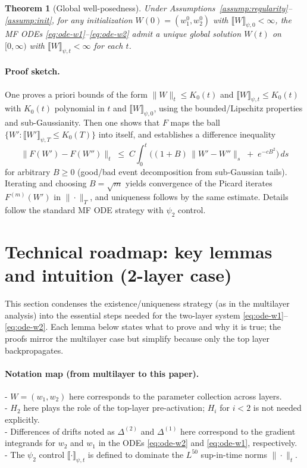 \documentclass[11pt]{article}
\newcommand{\1}{\mathbbm{1}}
\newtheorem{theorem}{Theorem}
\begin{document}
\begin{theorem}[Global well-posedness]\label{thm:wellposed}
Under Assumptions~\ref{assump:regularity}--\ref{assump:init}, for any initialization $W(0)=(w_1^0,w_2^0)$ with $\llbracket W\rrbracket_{\psi,0}<\infty$, the MF ODEs \eqref{eq:ode-w1}--\eqref{eq:ode-w2} admit a unique global solution $W(t)$ on $[0,\infty)$ with $\llbracket W\rrbracket_{\psi,t}<\infty$ for each $t$.
\end{theorem}

\paragraph{Proof sketch.}
One proves a priori bounds of the form $\|W\|_t\le K_0(t)$ and $\llbracket W\rrbracket_{\psi,t}\le K_0(t)$ with $K_0(t)$ polynomial in $t$ and $\llbracket W\rrbracket_{\psi,0}$, using the bounded/Lipschitz properties and sub-Gaussianity. Then one shows that $F$ maps the ball $\{W':\llbracket W'\rrbracket_{\psi,T}\le K_0(T)\}$ into itself, and establishes a difference inequality
\[
\|F(W')-F(W'')\|_t \;\le\; C\!\int_0^t \Big( (1+B)\,\|W'-W''\|_s \;+\; e^{-cB^2}\Big)\,ds
\]
for arbitrary $B\ge 0$ (good/bad event decomposition from sub-Gaussian tails). Iterating and choosing $B=\sqrt{m}$ yields convergence of the Picard iterates $F^{(m)}(W')$ in $\|\cdot\|_T$, and uniqueness follows by the same estimate. Details follow the standard MF ODE strategy with $\psi_2$ control.

\section{Technical roadmap: key lemmas and intuition (2-layer case)}

This section condenses the existence/uniqueness strategy (as in the multilayer analysis) into the essential steps needed for the two-layer system \eqref{eq:ode-w1}--\eqref{eq:ode-w2}. Each lemma below states what to prove and why it is true; the proofs mirror the multilayer case but simplify because only the top layer backpropagates.

\paragraph{Notation map (from multilayer to this paper).}
- $W=(w_1,w_2)$ here corresponds to the parameter collection across layers. \\
- $H_2$ here plays the role of the top-layer pre-activation; $H_i$ for $i<2$ is not needed explicitly. \\
- Differences of drifts noted as $\Delta^{(2)}$ and $\Delta^{(1)}$ here correspond to the gradient integrands for $w_2$ and $w_1$ in the ODEs \eqref{eq:ode-w2} and \eqref{eq:ode-w1}, respectively. \\
- The $\psi_2$ control $\llbracket\cdot\rrbracket_{\psi,t}$ is defined to dominate the $L^{50}$ sup-in-time norms $\|\cdot\|_t$.
\end{document}
